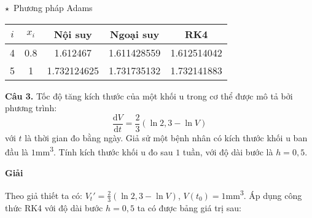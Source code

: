 $\star$~Phương pháp Adams
\begin{longtable}{|c|c|c|c|c|}\hline
	$i$ & $x_i$ & Nội suy     & Ngoại suy   & RK4         \\ \hline
	\endhead
	4   & 0.8   & 1.612467    & 1.611428559 & 1.612514042 \\ \hline
	5   & 1     & 1.732124625 & 1.731735132 & 1.732141883 \\ \hline
\end{longtable}

\textbf{Câu 3.} Tốc độ tăng kích thước của một khối u trong cơ thể được mô tả bởi phương trình: $$\frac{\text{d}V}{\text{d}t}=\frac{2}{3}\left(\ln{2,3} - \ln{V} \right)$$ với $t$ là thời gian đo bằng ngày. Giả sử một bệnh nhân có kích thước khối u ban đầu là $1$mm\textsuperscript{3}. Tính kích thước khối u đo sau $1$ tuần, với độ dài bước là $h=0,5$.\par
\textbf{Giải}\par
Theo giả thiết ta có: ${V_t}'= \frac{2}{3}\left(\ln{2,3}-\ln{V} \right)$, $V(t_0)=1$mm\textsuperscript{3}. Áp dụng công thức RK4 với độ dài bước $h=0,5$ ta có được bảng giá trị sau:


 